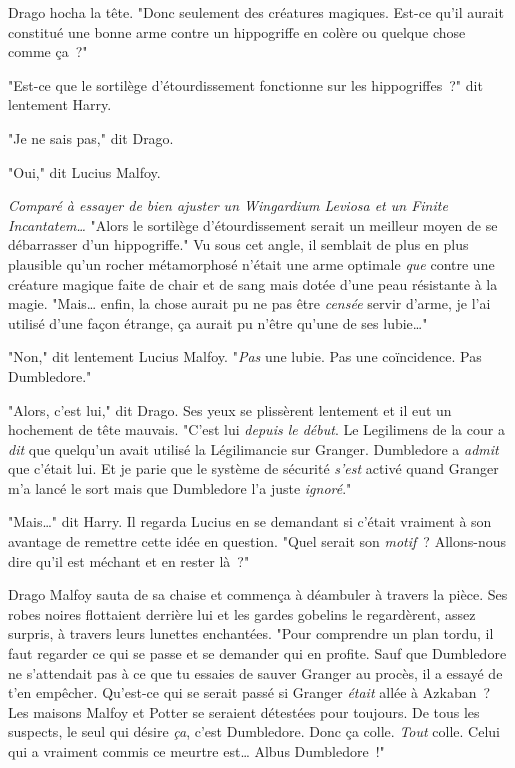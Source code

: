 Drago hocha la tête. "Donc seulement des créatures magiques. Est-ce qu'il aurait constitué une bonne arme contre un hippogriffe en colère ou quelque chose comme ça~?"

"Est-ce que le sortilège d'étourdissement fonctionne sur les hippogriffes~?" dit lentement Harry.

"Je ne sais pas," dit Drago.

"Oui," dit Lucius Malfoy.

\emph{Comparé à essayer de bien ajuster un Wingardium Leviosa et un Finite Incantatem…} "Alors le sortilège d'étourdissement serait un meilleur moyen de se débarrasser d'un hippogriffe." Vu sous cet angle, il semblait de plus en plus plausible qu'un rocher métamorphosé n'était une arme optimale \emph{que} contre une créature magique faite de chair et de sang mais dotée d'une peau résistante à la magie. "Mais… enfin, la chose aurait pu ne pas être \emph{censée} servir d'arme, je l'ai utilisé d'une façon étrange, ça aurait pu n'être qu'une de ses lubie…"

"Non," dit lentement Lucius Malfoy. "\emph{Pas} une lubie. Pas une coïncidence. Pas Dumbledore."

"Alors, c'est lui," dit Drago. Ses yeux se plissèrent lentement et il eut un hochement de tête mauvais. "C'est lui \emph{depuis le début}. Le Legilimens de la cour a \emph{dit} que quelqu'un avait utilisé la Légilimancie sur Granger. Dumbledore a \emph{admit} que c'était lui. Et je parie que le système de sécurité \emph{s'est} activé quand Granger m'a lancé le sort mais que Dumbledore l'a juste \emph{ignoré}."

"Mais…" dit Harry. Il regarda Lucius en se demandant si c'était vraiment à son avantage de remettre cette idée en question. "Quel serait son \emph{motif}~? Allons-nous dire qu'il est méchant et en rester là~?"

Drago Malfoy sauta de sa chaise et commença à déambuler à travers la pièce. Ses robes noires flottaient derrière lui et les gardes gobelins le regardèrent, assez surpris, à travers leurs lunettes enchantées. "Pour comprendre un plan tordu, il faut regarder ce qui se passe et se demander qui en profite. Sauf que Dumbledore ne s'attendait pas à ce que tu essaies de sauver Granger au procès, il a essayé de t'en empêcher. Qu'est-ce qui se serait passé si Granger \emph{était} allée à Azkaban~? Les maisons Malfoy et Potter se seraient détestées pour toujours. De tous les suspects, le seul qui désire \emph{ça}, c'est Dumbledore. Donc ça colle. \emph{Tout} colle. Celui qui a vraiment commis ce meurtre est… Albus Dumbledore~!"


